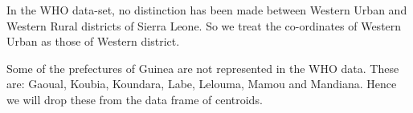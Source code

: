 \documentclass[11pt,]{article}
\newenvironment{Shaded}{\begin{snugshade}}{\end{snugshade}}
\newcommand{\KeywordTok}[1]{\textcolor[rgb]{0.13,0.29,0.53}{\textbf{#1}}}
\newcommand{\DataTypeTok}[1]{\textcolor[rgb]{0.13,0.29,0.53}{#1}}
\newcommand{\CharTok}[1]{\textcolor[rgb]{0.31,0.60,0.02}{#1}}
\newcommand{\StringTok}[1]{\textcolor[rgb]{0.31,0.60,0.02}{#1}}
\newcommand{\OperatorTok}[1]{\textcolor[rgb]{0.81,0.36,0.00}{\textbf{#1}}}
\newcommand{\NormalTok}[1]{#1}
\begin{document}
\begin{Shaded}
\end{Shaded}

In the WHO data-set, no distinction has been made between Western Urban
and Western Rural districts of Sierra Leone. So we treat the
co-ordinates of Western Urban as those of Western district.

\begin{Shaded}
\end{Shaded}

Some of the prefectures of Guinea are not represented in the WHO data.
These are: Gaoual, Koubia, Koundara, Labe, Lelouma, Mamou and Mandiana.
Hence we will drop these from the data frame of centroids.
\end{document}
